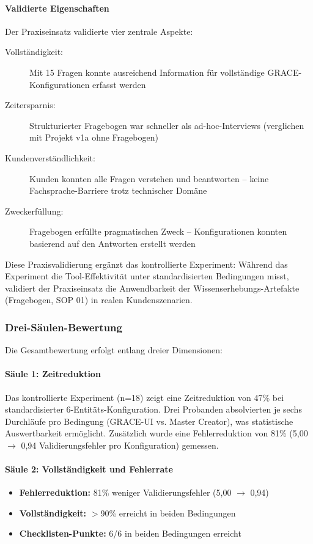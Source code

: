 \paragraph{Validierte Eigenschaften}
Der Praxiseinsatz validierte vier zentrale Aspekte:
\begin{description}
    \item[Vollständigkeit:] Mit 15 Fragen konnte ausreichend Information für vollständige GRACE-Konfigurationen erfasst werden
    \item[Zeitersparnis:] Strukturierter Fragebogen war schneller als ad-hoc-Interviews (verglichen mit Projekt v1a ohne Fragebogen)
    \item[Kundenverständlichkeit:] Kunden konnten alle Fragen verstehen und beantworten -- keine Fachsprache-Barriere trotz technischer Domäne
    \item[Zweckerfüllung:] Fragebogen erfüllte pragmatischen Zweck -- Konfigurationen konnten basierend auf den Antworten erstellt werden
\end{description}

Diese Praxisvalidierung ergänzt das kontrollierte Experiment: Während das Experiment die Tool-Effektivität unter standardisierten Bedingungen misst, validiert der Praxiseinsatz die Anwendbarkeit der Wissenserhebungs-Artefakte (Fragebogen, SOP 01) in realen Kundenszenarien.


\subsubsection{Drei-Säulen-Bewertung}
\label{subsubsec:DreiSaeulen}

Die Gesamtbewertung erfolgt entlang dreier Dimensionen:

\paragraph{Säule 1: Zeitreduktion}

Das kontrollierte Experiment (n=18) zeigt eine Zeitreduktion von 47\% bei standardisierter 6-Entitäts-Konfiguration. Drei Probanden absolvierten je sechs Durchläufe pro Bedingung (GRACE-UI vs. Master Creator), was statistische Auswertbarkeit ermöglicht. Zusätzlich wurde eine Fehlerreduktion von 81\% (5,00 $\rightarrow$ 0,94 Validierungsfehler pro Konfiguration) gemessen.

\paragraph{Säule 2: Vollständigkeit und Fehlerrate}
\begin{itemize}
    \item \textbf{Fehlerreduktion:} 81\% weniger Validierungsfehler (5,00 $\rightarrow$ 0,94)
    \item \textbf{Vollständigkeit:} $>$90\% erreicht in beiden Bedingungen
    \item \textbf{Checklisten-Punkte:} 6/6 in beiden Bedingungen erreicht
\end{itemize}

